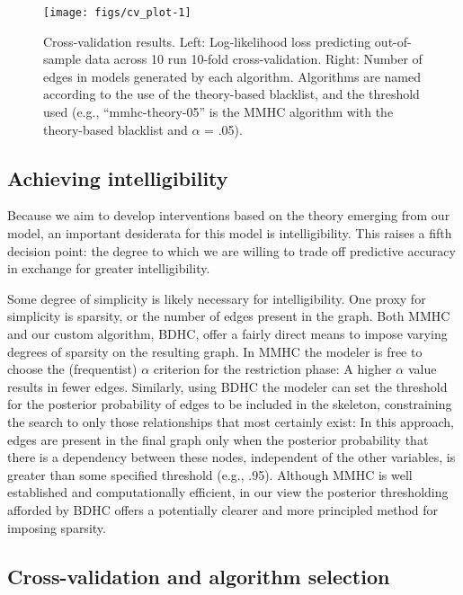 \documentclass[10pt, letterpaper]{article}
\newenvironment{CodeChunk}{}{}
\begin{document}
\begin{CodeChunk}
\begin{figure*}[h]

{\centering \texttt{[image: figs/cv\_plot-1]} 

}

\caption[Cross-validation results]{Cross-validation results. Left: Log-likelihood loss predicting out-of-sample data across 10 run 10-fold cross-validation. Right: Number of edges in models generated by each algorithm. Algorithms are named according to the use of the theory-based blacklist, and the threshold used (e.g., “mmhc-theory-05” is the MMHC algorithm with the theory-based blacklist and $\alpha$ = .05).}\label{fig:cv_plot}
\end{figure*}
\end{CodeChunk}

\subsection{Achieving intelligibility}\label{achieving-intelligibility}

Because we aim to develop interventions based on the theory emerging
from our model, an important desiderata for this model is
intelligibility. This raises a fifth decision point: the degree to which
we are willing to trade off predictive accuracy in exchange for greater
intelligibility.

Some degree of simplicity is likely necessary for intelligibility. One
proxy for simplicity is sparsity, or the number of edges present in the
graph. Both MMHC and our custom algorithm, BDHC, offer a fairly direct
means to impose varying degrees of sparsity on the resulting graph. In
MMHC the modeler is free to choose the (frequentist) \(\alpha\)
criterion for the restriction phase: A higher \(\alpha\) value results
in fewer edges. Similarly, using BDHC the modeler can set the threshold
for the posterior probability of edges to be included in the skeleton,
constraining the search to only those relationships that most certainly
exist: In this approach, edges are present in the final graph only when
the posterior probability that there is a dependency between these
nodes, independent of the other variables, is greater than some
specified threshold (e.g., .95). Although MMHC is well established and
computationally efficient, in our view the posterior thresholding
afforded by BDHC offers a potentially clearer and more principled method
for imposing sparsity.

\subsection{Cross-validation and algorithm
selection}\label{cross-validation-and-algorithm-selection}
\end{document}

